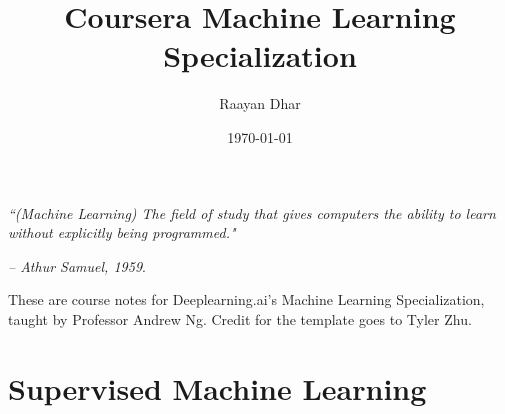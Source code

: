 \documentclass[11 pt]{scrartcl}
\begin{document}
 
\title{\Large Coursera Machine Learning Specialization}
\author{\large Raayan Dhar}
\date{\large\today}

\maketitle 

\begin{center}
\begin{displayquote}
    \emph{``(Machine Learning) The field of study that gives computers the ability to learn without explicitly being programmed."} \\ \begin{flushright} \emph{– Athur Samuel, 1959}.  \end{flushright}
\end{displayquote}
\end{center}


These are course notes for Deeplearning.ai's Machine Learning Specialization, taught by Professor Andrew Ng. Credit for the template goes to Tyler Zhu.

\tableofcontents 

\newpage

\section{Supervised Machine Learning}
\end{document}

